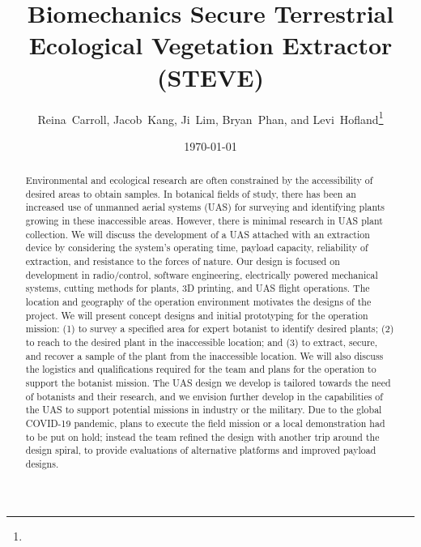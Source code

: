 \documentclass{wrcecapstone}
\title{Biomechanics Secure Terrestrial {\nobreak Ecological} Vegetation Extractor (STEVE)}
\author{Reina~Carroll, Jacob~Kang, Ji~Lim, Bryan~Phan, and Levi~Hofland\thanks{}}
\date{\today}
\begin{document}
\maketitlepage
\cleardoublepage
\tableofcontents
\listoffigures
\listoftables

\clearpage
\maketitle


\begin{abstract}
Environmental and ecological research are often constrained by the accessibility of desired areas to obtain samples. In botanical fields of study, there has been an increased use of unmanned aerial systems (UAS) for surveying and identifying plants growing in these inaccessible areas. However, there is minimal research in UAS plant collection. We will discuss the development of a UAS attached with an extraction device by considering the system’s operating time, payload capacity, reliability of extraction, and resistance to the forces of nature. Our design is focused on development in radio/control, software engineering, electrically powered mechanical systems, cutting methods for plants, 3D printing, and UAS flight operations. The location and geography of the operation environment motivates the designs of the project. We will present concept designs and initial prototyping for the operation mission: (1) to survey a specified area for expert botanist to identify desired plants; (2) to reach to the desired plant in the inaccessible location; and (3) to extract, secure, and recover a sample of the plant from the inaccessible location. We will also discuss the logistics and qualifications required for the team and plans for the operation to support the botanist mission. The UAS design we develop is tailored towards the need of botanists and their research, and we envision further develop in the capabilities of the UAS to support potential missions in industry or the military. Due to the global COVID-19 pandemic, plans to execute the field mission or a local demonstration had to be put on hold; instead the team refined the design with another trip around the design spiral, to provide evaluations of alternative platforms and improved payload designs. 
\end{abstract}
\end{document}
